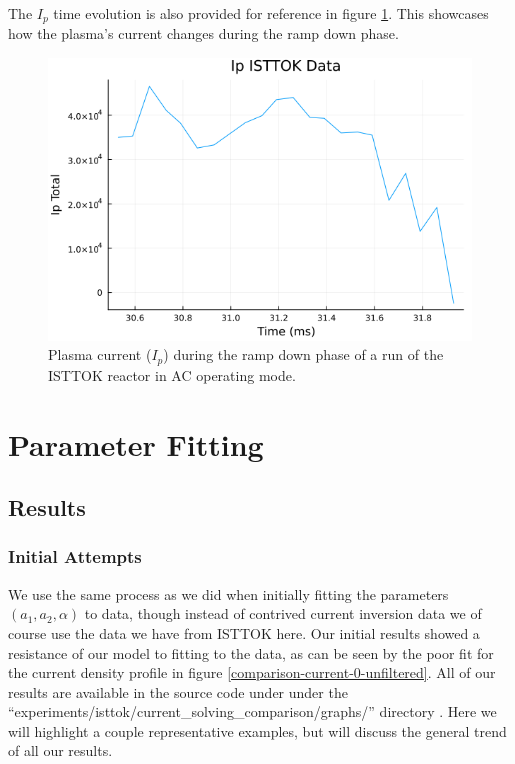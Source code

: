 The $I_p$ time evolution is also provided for reference in figure \ref{ip-time}. This showcases how the plasma's current 
changes during the ramp down phase.
\begin{figure}[h!]
    \centering
    \includegraphics[scale=0.6]{imgs/c5/ip_time_data.png}
    \caption{Plasma current ($I_p$) during the ramp down phase of a run of the ISTTOK reactor in AC operating mode.}
    \label{ip-time}
\end{figure}\newpage

\section{Parameter Fitting}

\subsection{Results}

\subsubsection{Initial Attempts}
We use the same process as we did when initially fitting the parameters $(a_1, a_2, \alpha)$ to data, though instead of contrived 
current inversion data we of course use the data we have from ISTTOK here. Our initial results 
showed a resistance of our model to fitting to the data, as can be seen by the poor fit for 
the current density profile in figure \ref{comparison-current-0-unfiltered}. All of our results are available in the source code under 
under the ``experiments/isttok/current\_solving\_comparison/graphs/'' directory \cite{project-source}.
Here we will highlight a couple representative examples, but will discuss the general trend 
of all our results.

